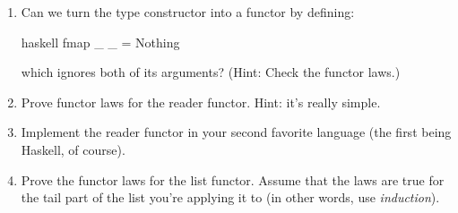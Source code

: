 \begin{enumerate}
  \tightlist
  \item
        Can we turn the  type constructor into a functor by
        defining:

        \begin{snip}{haskell}
fmap _ _ = Nothing
\end{snip}

        which ignores both of its arguments? (Hint: Check the functor laws.)
  \item
        Prove functor laws for the reader functor. Hint: it's really simple.
  \item
        Implement the reader functor in your second favorite language (the
        first being Haskell, of course).
  \item
        Prove the functor laws for the list functor. Assume that the laws are
        true for the tail part of the list you're applying it to (in other
        words, use \emph{induction}).
\end{enumerate}
